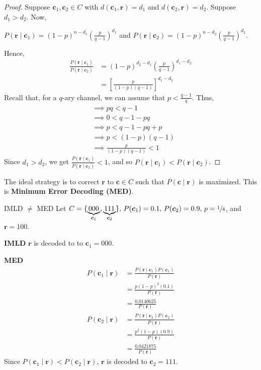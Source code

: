 \begin{proof}
    Suppose $ \bm{c}_1,\bm{c}_2\in C $ with $ d(\bm{c}_1,\bm{r})=d_1 $
    and $ d(\bm{c}_2,\bm{r})=d_2 $.
    Suppose $ d_1>d_2 $. Now,

    $ P(\bm{r}\mid \bm{c}_1)=(1-p)^{n-d_1}\left( \frac{p}{q-1} \right)^{d_1} $ and
    $ P(\bm{r}\mid \bm{c}_2)=(1-p)^{n-d_2}\left( \frac{p}{q-1} \right)^{d_2} $.

    Hence,
    \begin{align*}
        \frac{P(\bm{r}\mid \bm{c}_1)}{P(\bm{r}\mid \bm{c}_2)}
         & =(1-p)^{d_2-d_1}\left( \frac{p}{q-1}  \right)^{d_1-d_2} \\
         & =\left[ \frac{p}{(1-p)(q-1)}  \right]^{d_1-d_2}
    \end{align*}
    Recall that, for a $ q $-ary channel, we can assume that $ p<\frac{q-1}{q} $. Thus,
    \begin{align*}
         & \implies pq < q-1                 \\
         & \implies 0 < q-1-pq               \\
         & \implies p < q-1-pq+p             \\
         & \implies p < (1-p)(q-1)           \\
         & \implies \frac{p}{(1-p)(q-1)} < 1
    \end{align*}
    Since $ d_1>d_2 $, we get $ \frac{P(\bm{r}\mid \bm{c}_1)}{P(\bm{r}\mid \bm{c}_2)} < 1 $, and so
    $ P(\bm{r}\mid \bm{c}_1)<P(\bm{r}\mid \bm{c}_2) $.
\end{proof}
The ideal strategy is to correct $ \bm{r} $ to $ \bm{c}\in C $ such that
$ P(\bm{c}\mid \bm{r}) $ is maximized. This is \textbf{Minimum Error Decoding (MED)}.


\begin{Example}{IMLD $ \neq $ MED}{}
    Let $ C=\{\underbrace{000}_{\bm{c}_1},\underbrace{111}_{\bm{c}_2}\},\,
        P(\bm{c}_1)=0.1,\, P(\bm{c}_2)=0.9,\, p=\sfrac{1}{4} $, and $ \bm{r}=100 $.

    \textbf{IMLD} $ \bm{r} $ is decoded to to $ \bm{c}_1 = 000 $.

    \textbf{MED}
    \begin{align*}
        P(\bm{c}_1\mid \bm{r})
         & =\frac{P(\bm{r}\mid \bm{c}_1)P(\bm{c}_1)}{P(\bm{r})} \\
         & =\frac{p(1-p)^2(0.1)}{P(\bm{r})}                     \\
         & =\frac{0.0140625}{P(\bm{r})}
    \end{align*}
    \begin{align*}
        P(\bm{c}_2\mid \bm{r})
         & =\frac{P(\bm{r}\mid \bm{c}_2)P(\bm{c}_2)}{P(\bm{r})} \\
         & =\frac{p^2(1-p)(0.9)}{P(\bm{r})}                     \\
         & =\frac{0.0421875}{P(\bm{r})}
    \end{align*}
    Since $ P(\bm{c}_1\mid \bm{r})<P(\bm{c}_2\mid \bm{r}) $,
    $ \bm{r} $ is decoded to $ \bm{c}_2=111 $.
\end{Example}


